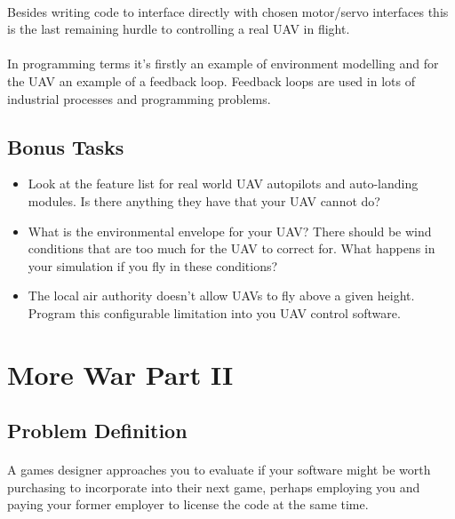 \documentclass[11pt]{book}
\begin{document}
\paragraph{} Besides writing code to interface directly with chosen motor/servo interfaces this is the last remaining hurdle to controlling a real UAV in flight.

\paragraph{} In programming terms it's firstly an example of environment modelling and for the UAV an example of a feedback loop. Feedback loops are used in lots of industrial processes and programming problems.

\subsection{Bonus Tasks}

\begin{itemize}
\item Look at the feature list for real world UAV autopilots and auto-landing modules. Is there anything they have that your UAV cannot do?
\item What is the environmental envelope for your UAV? There should be wind conditions that are too much for the UAV to correct for. What happens in your simulation if you fly in these conditions?
\item The local air authority doesn't allow UAVs to fly above a given height. Program this configurable limitation into you UAV control software.
\end{itemize}

\clearpage



\section{More War Part II}

\subsection{Problem Definition}

\paragraph{} A games designer approaches you to evaluate if your software might be worth purchasing to incorporate into their next game, perhaps employing you and paying your former employer to license the code at the same time.
\end{document}
